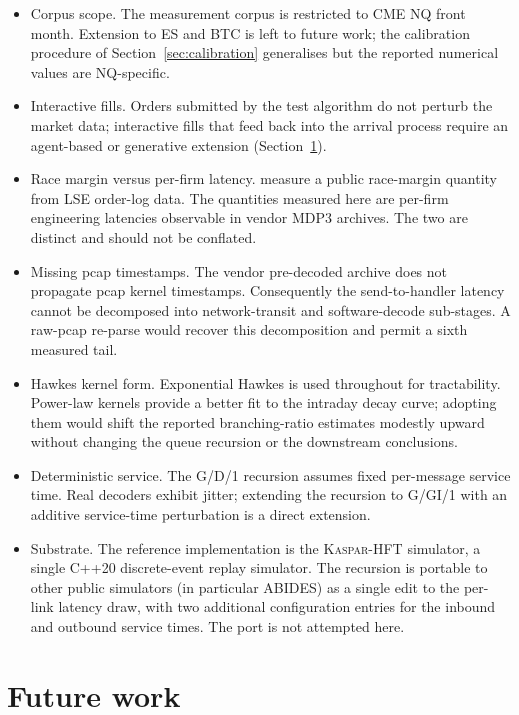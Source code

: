 \documentclass[11pt]{article}
\newcommand{\kasparhft}{\textsc{Kaspar-HFT}}
\begin{document}
\begin{itemize}
    \item Corpus scope. The measurement corpus is restricted to CME NQ front month. Extension to ES and BTC is left to future work; the calibration procedure of Section~\ref{sec:calibration} generalises but the reported numerical values are NQ-specific.
    \item Interactive fills. Orders submitted by the test algorithm do not perturb the market data; interactive fills that feed back into the arrival process require an agent-based or generative extension (Section~\ref{sec:future}).
    \item Race margin versus per-firm latency. \citet{aquilina2022arms} measure a public race-margin quantity from LSE order-log data. The quantities measured here are per-firm engineering latencies observable in vendor MDP3 archives. The two are distinct and should not be conflated.
    \item Missing pcap timestamps. The vendor pre-decoded archive does not propagate pcap kernel timestamps. Consequently the send-to-handler latency cannot be decomposed into network-transit and software-decode sub-stages. A raw-pcap re-parse would recover this decomposition and permit a sixth measured tail.
    \item Hawkes kernel form. Exponential Hawkes is used throughout for tractability. Power-law kernels \citep{hardiman2013} provide a better fit to the intraday decay curve; adopting them would shift the reported branching-ratio estimates modestly upward without changing the queue recursion or the downstream conclusions.
    \item Deterministic service. The G/D/1 recursion assumes fixed per-message service time. Real decoders exhibit jitter; extending the recursion to G/GI/1 with an additive service-time perturbation is a direct extension.
    \item Substrate. The reference implementation is the \kasparhft{} simulator, a single C++20 discrete-event replay simulator. The recursion is portable to other public simulators (in particular ABIDES) as a single edit to the per-link latency draw, with two additional configuration entries for the inbound and outbound service times. The port is not attempted here.
\end{itemize}

\section{Future work}
\label{sec:future}
\end{document}
